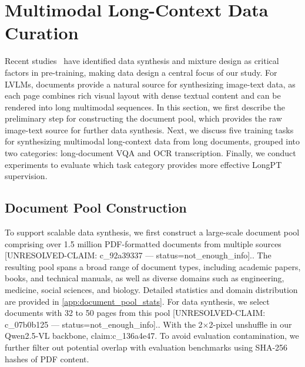 \section{Multimodal Long-Context Data Curation}
\label{sec:curation}
Recent studies~\citep{team2025gemma3,google2026gemma4,hong2025glm} have identified data synthesis and mixture design as critical factors in pre-training, making data design a central focus of our study.
For LVLMs, documents provide a natural source for synthesizing image-text data, as each page combines rich visual layout with dense textual content and can be rendered into long multimodal sequences.
In this section, we first describe the preliminary step for constructing the document pool, which provides the raw image-text source for further data synthesis.
Next, we discuss five training tasks for synthesizing multimodal long-context data from long documents, grouped into two categories: long-document VQA and OCR transcription.
Finally, we conduct experiments to evaluate which task category provides more effective LongPT supervision.

\subsection{Document Pool Construction}
\label{sec:curation:document_pool_construction}
To support scalable data synthesis, we first construct a large-scale document pool comprising over 1.5 million PDF-formatted documents from multiple sources [UNRESOLVED-CLAIM: c_92a39337 — status=not_enough_info]..
The resulting pool spans a broad range of document types, including academic papers, books, and technical manuals, as well as diverse domains such as engineering, medicine, social sciences, and biology.
Detailed statistics and domain distribution are provided in \cref{app:document_pool_stats}.
For data synthesis, we select documents with 32 to 50 pages from this pool [UNRESOLVED-CLAIM: c_07b0b125 — status=not_enough_info]..
With the 2$\times$2-pixel unshuffle in our Qwen2.5-VL backbone, {{claim:c_136a4e47}}.
To avoid evaluation contamination, we further filter out potential overlap with evaluation benchmarks using SHA-256 hashes of PDF content.

